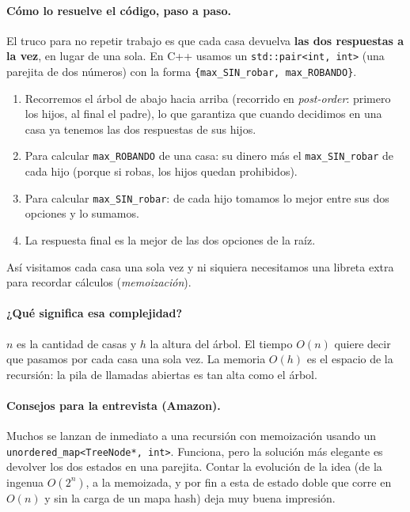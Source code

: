 \paragraph{Cómo lo resuelve el código, paso a paso.} El truco para no repetir
trabajo es que cada casa devuelva \textbf{las dos respuestas a la vez}, en lugar
de una sola. En C++ usamos un \texttt{std::pair<int, int>} (una parejita de dos
números) con la forma \texttt{\{max\_SIN\_robar, max\_ROBANDO\}}.
\begin{enumerate}
    \item Recorremos el árbol de abajo hacia arriba (recorrido en \emph{post-order}: primero los hijos, al final el padre), lo que garantiza que cuando decidimos en una casa ya tenemos las dos respuestas de sus hijos.
    \item Para calcular \texttt{max\_ROBANDO} de una casa: su dinero más el \texttt{max\_SIN\_robar} de cada hijo (porque si robas, los hijos quedan prohibidos).
    \item Para calcular \texttt{max\_SIN\_robar}: de cada hijo tomamos lo mejor entre sus dos opciones y lo sumamos.
    \item La respuesta final es la mejor de las dos opciones de la raíz.
\end{enumerate}
Así visitamos cada casa una sola vez y ni siquiera necesitamos una libreta
extra para recordar cálculos (\emph{memoización}).




\paragraph{¿Qué significa esa complejidad?} $n$ es la cantidad de casas y $h$ la
altura del árbol. El tiempo $O(n)$ quiere decir que pasamos por cada casa una
sola vez. La memoria $O(h)$ es el espacio de la recursión: la pila de llamadas
abiertas es tan alta como el árbol.

\paragraph{Consejos para la entrevista (Amazon).} Muchos se lanzan de inmediato a
una recursión con memoización usando un \texttt{unordered\_map<TreeNode*, int>}.
Funciona, pero la solución más elegante es devolver los dos estados en una
parejita. Contar la evolución de la idea (de la ingenua $O(2^n)$, a la memoizada,
y por fin a esta de estado doble que corre en $O(n)$ y sin la carga de un mapa
hash) deja muy buena impresión.
